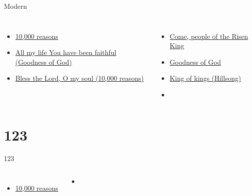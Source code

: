 \documentclass{beamer}
\begin{document}
\begin{frame}[t]{Modern}
\begin{columns}[t]
        \begin{itemize}
    \item \hyperlink{10,000 reasons['Bless the Lord, O my soul']}{10,000 reasons } \phantom{ 1 1 1 1 1 1 1 1 1 1}
    \item \hyperlink{Goodness of God['All my life You have been faithful']}{All my life You have been faithful (Goodness of God)} \phantom{}
    \item \hyperlink{10,000 reasons['Bless the Lord, O my soul']}{Bless the Lord, O my soul (10,000 reasons)} \phantom{}
\end{itemize}
        \begin{itemize}
            \item \hyperlink{Come, people of the Risen King[]}{Come, people of the Risen King } \phantom{ 1 1}
                    \item \hyperlink{Goodness of God['All my life You have been faithful']}{Goodness of God } \phantom{ 1 1 1 1 1 1 1 1 1 1}
    \item \hyperlink{King of kings[](Hillsong)}{King of kings (Hillsong)} \phantom{ 1 1 1 1 1 1}
    \item[] \phantom{1}\end{itemize}


\end{columns}

\end{frame}

\section{123}

\begin{frame}[t]{123}
\begin{columns}[t]
        \begin{itemize}
    \item \hyperlink{10,000 reasons['Bless the Lord, O my soul']}{10,000 reasons } \phantom{ 1 1 1 1 1 1 1 1 1 1}
\end{itemize}
        \begin{itemize}
            \item[] \phantom{1}\end{itemize}


\end{columns}

\end{frame}
\end{document}

